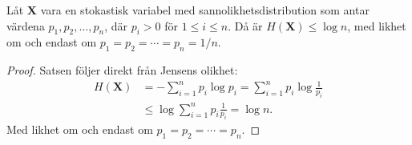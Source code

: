 \documentclass{beamer}
\DeclareMathOperator{\N}{\mathbb{N}}
\let\stoch\mathbf{}
\begin{document}
%
%
%

\begin{frame}
  \begin{theorem}
    Låt \(\stoch X\) vara en stokastisk variabel med sannolikhetsdistribution 
    som antar värdena \(p_1, p_2,\ldots, p_n\), där \(p_i > 0\) för \(1\leq 
    i\leq n\).
    Då är \(H(\stoch X)\leq \log n\), med likhet om och endast om \(p_1 = p_2 
    = \cdots = p_n = 1/n\).
  \end{theorem}
\end{frame}

\begin{frame}
  \begin{proof}
    Satsen följer direkt från Jensens olikhet:
    \begin{align*}
      H(\stoch X) &= -\sum_{i=1}^n p_i\log p_i = \sum_{i=1}^n 
      p_i\log\frac{1}{p_i} \\
      &\leq \log\sum_{i=1}^n p_i\frac{1}{p_i} = \log n.
    \end{align*}
    Med likhet om och endast om \(p_1 = p_2 = \cdots = p_n\).
  \end{proof}
\end{frame}
\end{document}
